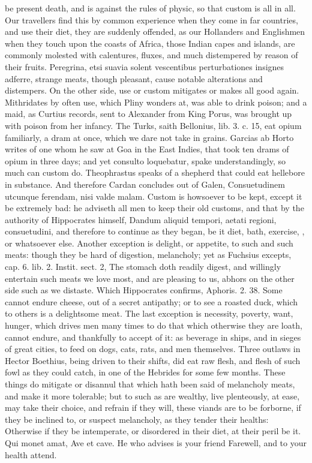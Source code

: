 {be present death, and is against the rules of physic, so that custom is
all in all. Our travellers find this by common experience when they
come in far countries, and use their diet, they are suddenly offended,
as our Hollanders and Englishmen when they touch upon the coasts
of Africa, those Indian capes and islands, are commonly molested with
calentures, fluxes, and much distempered by reason of their fruits.
Peregrina, etsi suavia solent vescentibus perturbationes insignes
adferre, strange meats, though pleasant, cause notable alterations and
distempers. On the other side, use or custom mitigates or makes all
good again. Mithridates by often use, which Pliny wonders at, was able
to drink poison; and a maid, as Curtius records, sent to Alexander from
King Porus, was brought up with poison from her infancy. The Turks,
saith Bellonius, lib. 3. c. 15, eat opium familiarly, a dram at once,
which we dare not take in grains. Garcias ab Horto writes of one
whom he saw at Goa in the East Indies, that took ten drams of opium in
three days; and yet consulto loquebatur, spake understandingly, so much
can custom do.  Theophrastus speaks of a shepherd that could eat
hellebore in substance. And therefore Cardan concludes out of Galen,
Consuetudinem utcunque ferendam, nisi valde malam. Custom is howsoever
to be kept, except it be extremely bad: he adviseth all men to keep
their old customs, and that by the authority of Hippocrates
himself, Dandum aliquid tempori, aetati regioni, consuetudini, and
therefore to continue as they began, be it diet, bath, exercise,
\etc{}, or whatsoever else.
Another exception is delight, or appetite, to such and such meats:
though they be hard of digestion, melancholy; yet as Fuchsius excepts,
cap. 6. lib. 2. Instit. sect. 2, The stomach doth readily digest,
and willingly entertain such meats we love most, and are pleasing to
us, abhors on the other side such as we distaste. Which Hippocrates
confirms, Aphoris. 2. 38. Some cannot endure cheese, out of a secret
antipathy; or to see a roasted duck, which to others is a
delightsome meat.
The last exception is necessity, poverty, want, hunger, which drives
men many times to do that which otherwise they are loath, cannot
endure, and thankfully to accept of it: as beverage in ships, and in
sieges of great cities, to feed on dogs, cats, rats, and men
themselves. Three outlaws in Hector Boethius, being driven to
their shifts, did eat raw flesh, and flesh of such fowl as they could
catch, in one of the Hebrides for some few months. These things do
mitigate or disannul that which hath been said of melancholy meats, and
make it more tolerable; but to such as are wealthy, live plenteously,
at ease, may take their choice, and refrain if they will, these viands
are to be forborne, if they be inclined to, or suspect melancholy, as
they tender their healths: Otherwise if they be intemperate, or
disordered in their diet, at their peril be it. Qui monet amat, Ave et
cave.
He who advises is your friend
Farewell, and to your health attend.


}
